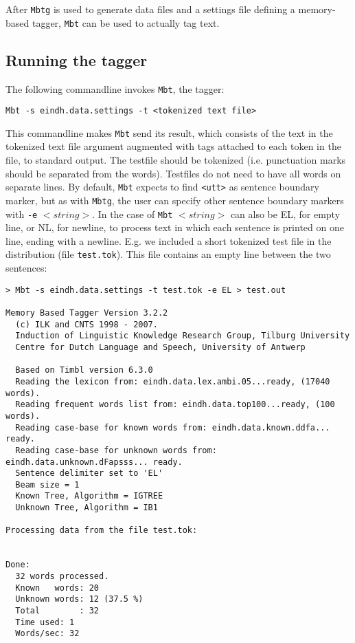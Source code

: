 \documentclass{report}
\begin{document}
After {\tt Mbtg} is used to generate data files and a settings file
defining a memory-based tagger, {\tt Mbt} can be used to actually tag
text.

\subsection{Running the tagger}

The following commandline invokes {\tt Mbt}, the tagger:

{\small
\begin{verbatim}
Mbt -s eindh.data.settings -t <tokenized text file>
\end{verbatim}
}

This commandline makes {\tt Mbt} send its result, which consists of
the text in the tokenized text file argument augmented with tags
attached to each token in the file, to standard output. The testfile
should be tokenized (i.e. punctuation marks should be separated from
the words). Testfiles do not need to have all words on separate
lines. By default, {\tt Mbt} expects to find {\tt <utt>} as sentence
boundary marker, but as with {\tt Mbtg}, the user can specify other sentence
boundary markers with {\tt -e} $<string>$. In the case of {\tt Mbt}
$<string>$ can also be EL, for empty line, or NL, for newline, to
process text in which each sentence is printed on one line, ending
with a newline. E.g. we included a short tokenized test file in the
distribution (file {\tt test.tok}). This file contains an empty line
between the two sentences:

{\small
\begin{verbatim}
> Mbt -s eindh.data.settings -t test.tok -e EL > test.out

Memory Based Tagger Version 3.2.2
  (c) ILK and CNTS 1998 - 2007.
  Induction of Linguistic Knowledge Research Group, Tilburg University
  Centre for Dutch Language and Speech, University of Antwerp

  Based on Timbl version 6.3.0
  Reading the lexicon from: eindh.data.lex.ambi.05...ready, (17040 words).
  Reading frequent words list from: eindh.data.top100...ready, (100 words).
  Reading case-base for known words from: eindh.data.known.ddfa... ready.
  Reading case-base for unknown words from: eindh.data.unknown.dFapsss... ready.
  Sentence delimiter set to 'EL'
  Beam size = 1
  Known Tree, Algorithm = IGTREE
  Unknown Tree, Algorithm = IB1

Processing data from the file test.tok:


Done:
  32 words processed.
  Known   words: 20
  Unknown words: 12 (37.5 %)
  Total        : 32
  Time used: 1
  Words/sec: 32
\end{verbatim}
}
\end{document}
